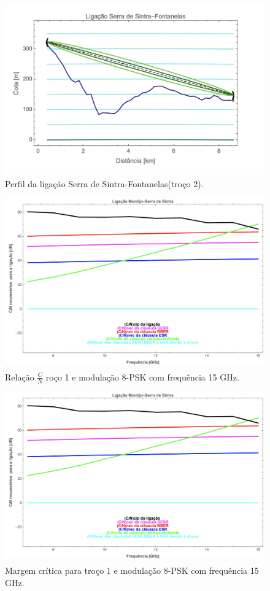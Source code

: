 \begin{figure}[H]
\centering
\includegraphics[scale=0.65]{perfil2.png}
\caption{Perfil da ligação Serra de Sintra-Fontanelas(troço 2).}
\label{perfil2}
\end{figure}
\begin{figure}[H]
\centering
\includegraphics[scale=0.4]{cn_m_s.png}
\caption{Relação $\frac{C}{N}$ roço 1 e modulação 8-PSK com frequência 15 GHz.}
\end{figure}

\begin{figure}[H]
\centering
\includegraphics[scale=0.4]{cn_m_s.png}
\caption{Margem crítica para troço 1 e modulação 8-PSK com frequência 15 GHz.}
\end{figure}


